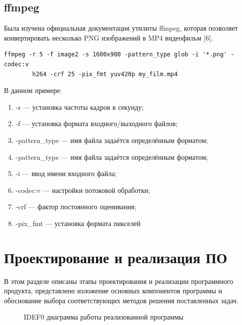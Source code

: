 \documentclass[a4paper,14pt]{extreport}
\begin{document}
		\section{ffmpeg}
		Была изучена официальная документация утилиты ffmpeg, которая 
позволяет конвертировать несколько PNG изображений в MP4 видеофильм [6].
		\begin{lstlisting}[label=some-code,caption= пример использования утилиты ffmpeg]
		ffmpeg -r 5 -f image2 -s 1600x900 -pattern_type glob -i '*.png' -codec:v
		h264 -crf 25 -pix_fmt yuv420p my_film.mp4
		\end{lstlisting}
		\par В данном примере:
		\begin{enumerate} 
        			\item -r — установка частоты кадров в секунду;
			\item -f — установка формата входного/выходного файлов;
			\item -pattern\_type — имя файла задаётся определённым форматом;
			\item -pattern\_type — имя файла задаётся определённым форматом;
			\item -i — ввод имени входного файла;
			\item -codec:v — настройки потоковой обработки;
			\item -crf — фактор постоянного оценивания; 
			\item -pix\_fmt — установка формата пикселей
    		\end{enumerate} 
		
		\chapter{Проектирование и реализация ПО}
		В этом разделе описаны этапы проектирования и реализации 
программного продукта, представлено изложение основных компонентов 
программы и обоснование выбора соответствующих методов решения 
поставленных задач. 
		\begin{figure}[H]
		\caption{IDEF0 диаграмма работы реализованной программы}
		\label{ris:image}
		\end{figure}
\end{document}
